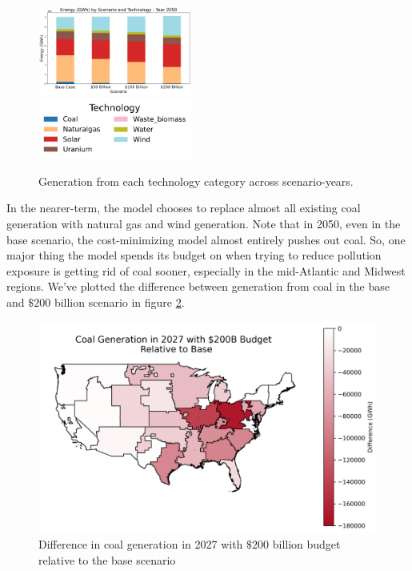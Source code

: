 \documentclass[a4paper]{article}
\theoremstyle{definition}
\theoremstyle{plain}
\begin{document}
\begin{figure}
    {\includegraphics[width=0.45\textwidth]{Figures/EndogenousPaper/Dispatch_Relative_by_scenario_2050.png}}\\
    \includegraphics[width=0.45\textwidth]{Figures/EndogenousPaper/Legend_2050.png}
    \caption{Generation from each technology category across scenario-years.}
    \label{Generation}

\end{figure}

In the nearer-term, the model chooses to replace almost all existing coal generation with natural gas and wind generation. Note that in 2050, even in the base scenario, the cost-minimizing model almost entirely pushes out coal. So, one major thing the model spends its budget on when trying to reduce pollution exposure is getting rid of coal sooner, especially in the mid-Atlantic and Midwest regions. We've plotted the difference between generation from coal in the base and $\$200$ billion scenario in figure \ref{coalmap}.
\begin{figure}
    \centering
    \includegraphics[width=0.8\linewidth]{Figures/EndogenousPaper/coal_generation_map_2027_200B.png}
    \caption{Difference in coal generation in 2027 with $\$200$ billion budget relative to the base scenario}
    \label{coalmap}
\end{figure}
\end{document}
